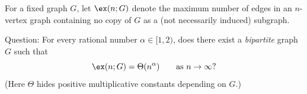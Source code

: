 For a fixed graph $G$, let $\ex(n;G)$ denote the maximum number of edges in an $n$-vertex graph containing no copy of $G$ as a (not necessarily induced) subgraph.

Question: For every rational number $\alpha\in[1,2)$, does there exist a \emph{bipartite} graph $G$ such that
\[
\ex(n;G)=\Theta(n^{\alpha})\qquad\text{as }n\to\infty?
\]
(Here $\Theta$ hides positive multiplicative constants depending on $G$.)
